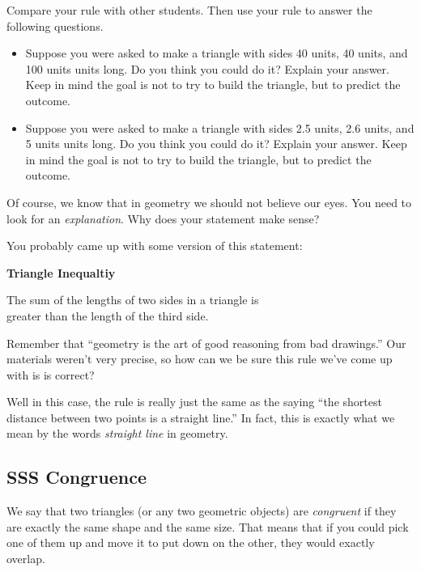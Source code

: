\bigskip
\bigskip
\bigskip


\begin{thinkpair*}
Compare your rule with other students.  
Then use your rule to answer the following questions.
\begin{itemize}
\item
Suppose you were asked to make a triangle with sides 40 units, 40 units, and 100 units units long. Do you think you could do it? Explain your answer. Keep in mind the goal is not to try to build the triangle, but to predict the outcome.\\
\item
Suppose you were asked to make a triangle with sides 2.5 units, 2.6 units, and 5 units units long. Do you think you could do it? Explain your answer. Keep in mind the goal is not to try to build the triangle, but to predict the outcome.
\end{itemize}
Of course, we know that in geometry we should not believe our eyes.    You need to look for an \emph{explanation}.  Why does your statement make sense?

\end{thinkpair*}

\newpage


You probably came up with some version of this statement:
\begin{center}
{\bf Triangle Inequaltiy}

The sum of the lengths of two sides in a triangle is \\
greater than the length of the third side.
\end{center}

\bigskip

Remember  that   ``geometry is the art of good reasoning from bad drawings.''  Our materials weren't very precise, so how can we be sure this rule we've come up with is is correct?  

Well in this case, the rule is really just the same as the saying ``the shortest distance between two points is a straight line.''  In fact, this is exactly what we mean by the words \emph{straight line} in geometry.  



\newpage

\subsection{SSS Congruence}
We say that two triangles (or any two geometric objects) are \emph{congruent} if they are exactly the same shape and the same size.  That means that if you could pick one of them up and move it to put down on the other, they would exactly overlap.

